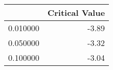 \begin{tabular}{lr}
\toprule
 & Critical Value \\
\midrule
0.010000 & -3.89 \\
0.050000 & -3.32 \\
0.100000 & -3.04 \\
\bottomrule
\end{tabular}
